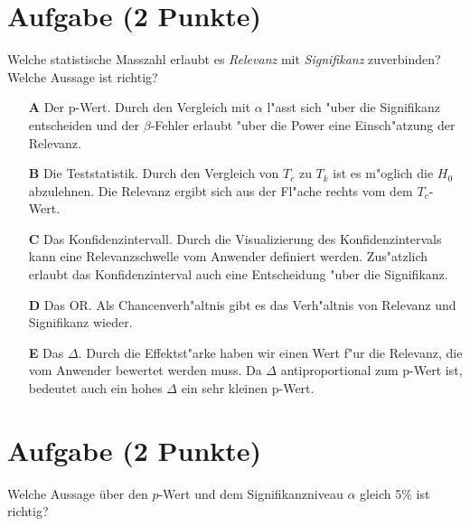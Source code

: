 \documentclass[a4paper, 9pt]{scrartcl}\usepackage[]{graphicx}\usepackage[]{xcolor}
\begin{document}
\section{Aufgabe \hfill (2 Punkte)}

Welche statistische Masszahl erlaubt es \textit{Relevanz} mit
\textit{Signifikanz} zuverbinden? Welche Aussage ist richtig?



\begin{enumerate}
\item [\textbf{A} \msquare] Der p-Wert. Durch den Vergleich mit $\alpha$ l{"a}sst sich {"u}ber die Signifikanz entscheiden und der $\beta$-Fehler erlaubt {"u}ber die Power eine Einsch{"a}tzung der Relevanz.
\item [\textbf{B} \msquare] Die Teststatistik. Durch den Vergleich von $T_c$ zu $T_k$ ist es m{"o}glich die $H_0$ abzulehnen. Die Relevanz ergibt sich aus der Fl{"a}che rechts vom dem $T_c$-Wert.
\item [\textbf{C} \msquare] Das Konfidenzintervall. Durch die Visualizierung des Konfidenzintervals kann eine Relevanzschwelle vom Anwender definiert werden. Zus{"a}tzlich erlaubt das Konfidenzinterval auch eine Entscheidung {"u}ber die Signifikanz.
\item [\textbf{D} \msquare] Das OR. Als Chancenverh{"a}ltnis gibt es das Verh{"a}ltnis von Relevanz und Signifikanz wieder.
\item [\textbf{E} \msquare] Das $\Delta$. Durch die Effektst{"a}rke haben wir einen Wert f{"u}r die Relevanz, die vom Anwender bewertet werden muss. Da $\Delta$ antiproportional zum p-Wert ist, bedeutet auch ein hohes $\Delta$ ein sehr kleinen p-Wert.
\end{enumerate}

\section{Aufgabe \hfill (2 Punkte)}

Welche Aussage über den $p$-Wert und dem Signifikanzniveau $\alpha$ gleich 5\% ist richtig?
\end{document}
